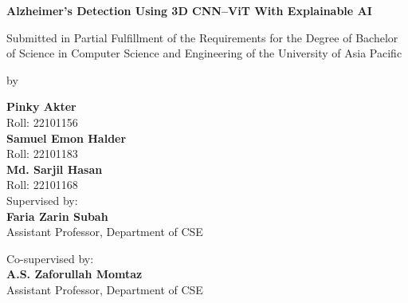 \begin{titlepage}
    \begin{center}
        
        
        
        
        \LARGE
        \textbf{Alzheimer's Detection Using 3D CNN–ViT With Explainable AI}
         
        \par 
        \large
        Submitted in Partial Fulfillment of the Requirements for the Degree of Bachelor of Science in Computer Science and Engineering of the University of Asia Pacific\\

        \vspace{1cm}
        
        by
        \Large
        \par
        \textbf{Pinky Akter}\\Roll: 22101156\\
        \vspace{0.2cm}
        \textbf{Samuel Emon Halder}\\Roll: 22101183\\
        \vspace{0.2cm}
        \textbf{Md. Sarjil Hasan}\\Roll: 22101168\\
        
        \vspace{1.5cm}
        Supervised by:\\
        \Large
        \textbf{Faria Zarin Subah}\\Assistant Professor, Department of CSE\\
        \vspace{0.2cm}
        

         \vspace{1cm}
        Co-supervised by:\\
        \Large
        \textbf{A.S. Zaforullah Momtaz}\\Assistant Professor, Department of CSE\\
        \vspace{0.5cm}      
     

\end{center}
\end{titlepage}

